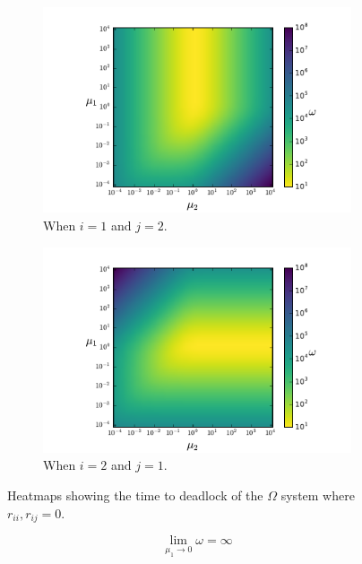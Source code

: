 \documentclass{article}
\begin{document}
\begin{figure}[htbp!]
	\begin{center}
	  \begin{subfigure}{0.45\textwidth}
		\includegraphics[width=\textwidth]{images/r21r22.pdf}
		\caption{When $i = 1$ and $j = 2$.}
	  \end{subfigure}
	  \begin{subfigure}{0.45\textwidth}
		\includegraphics[width=\textwidth]{images/r11r12.pdf}
		\caption{When $i = 2$ and $j = 1$.}
	  \end{subfigure}
	\end{center}
	\caption{Heatmaps showing the time to deadlock of the $\Omega$ system where $r_{ii}, r_{ij} = 0$.}
	\label{fig:rjirjj}
\end{figure}


\begin{equation}\label{eqn:r21r22_0_}
\lim_{\mu_1 \to 0} \omega = \infty
\end{equation}
\end{document}
